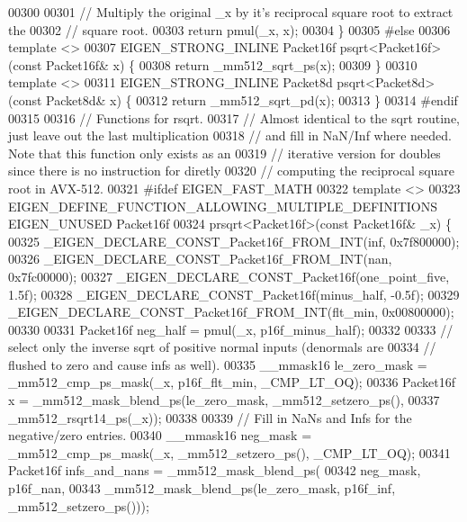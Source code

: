 \begin{DoxyCode}
00300 
00301   \textcolor{comment}{// Multiply the original \_x by it's reciprocal square root to extract the}
00302   \textcolor{comment}{// square root.}
00303   \textcolor{keywordflow}{return} pmul(\_x, x);
00304 \}
00305 \textcolor{preprocessor}{#else}
00306 \textcolor{keyword}{template} <>
00307 EIGEN\_STRONG\_INLINE Packet16f psqrt<Packet16f>(\textcolor{keyword}{const} Packet16f& x) \{
00308   \textcolor{keywordflow}{return} \_mm512\_sqrt\_ps(x);
00309 \}
00310 \textcolor{keyword}{template} <>
00311 EIGEN\_STRONG\_INLINE Packet8d psqrt<Packet8d>(\textcolor{keyword}{const} Packet8d& x) \{
00312   \textcolor{keywordflow}{return} \_mm512\_sqrt\_pd(x);
00313 \}
00314 \textcolor{preprocessor}{#endif}
00315 
00316 \textcolor{comment}{// Functions for rsqrt.}
00317 \textcolor{comment}{// Almost identical to the sqrt routine, just leave out the last multiplication}
00318 \textcolor{comment}{// and fill in NaN/Inf where needed. Note that this function only exists as an}
00319 \textcolor{comment}{// iterative version for doubles since there is no instruction for diretly}
00320 \textcolor{comment}{// computing the reciprocal square root in AVX-512.}
00321 \textcolor{preprocessor}{#ifdef EIGEN\_FAST\_MATH}
00322 \textcolor{keyword}{template} <>
00323 EIGEN\_DEFINE\_FUNCTION\_ALLOWING\_MULTIPLE\_DEFINITIONS EIGEN\_UNUSED Packet16f
00324 prsqrt<Packet16f>(\textcolor{keyword}{const} Packet16f& \_x) \{
00325   \_EIGEN\_DECLARE\_CONST\_Packet16f\_FROM\_INT(inf, 0x7f800000);
00326   \_EIGEN\_DECLARE\_CONST\_Packet16f\_FROM\_INT(nan, 0x7fc00000);
00327   \_EIGEN\_DECLARE\_CONST\_Packet16f(one\_point\_five, 1.5f);
00328   \_EIGEN\_DECLARE\_CONST\_Packet16f(minus\_half, -0.5f);
00329   \_EIGEN\_DECLARE\_CONST\_Packet16f\_FROM\_INT(flt\_min, 0x00800000);
00330 
00331   Packet16f neg\_half = pmul(\_x, p16f\_minus\_half);
00332 
00333   \textcolor{comment}{// select only the inverse sqrt of positive normal inputs (denormals are}
00334   \textcolor{comment}{// flushed to zero and cause infs as well).}
00335   \_\_mmask16 le\_zero\_mask = \_mm512\_cmp\_ps\_mask(\_x, p16f\_flt\_min, \_CMP\_LT\_OQ);
00336   Packet16f x = \_mm512\_mask\_blend\_ps(le\_zero\_mask, \_mm512\_setzero\_ps(),
00337                                      \_mm512\_rsqrt14\_ps(\_x));
00338 
00339   \textcolor{comment}{// Fill in NaNs and Infs for the negative/zero entries.}
00340   \_\_mmask16 neg\_mask = \_mm512\_cmp\_ps\_mask(\_x, \_mm512\_setzero\_ps(), \_CMP\_LT\_OQ);
00341   Packet16f infs\_and\_nans = \_mm512\_mask\_blend\_ps(
00342       neg\_mask, p16f\_nan,
00343       \_mm512\_mask\_blend\_ps(le\_zero\_mask, p16f\_inf, \_mm512\_setzero\_ps()));

\end{DoxyCode}
